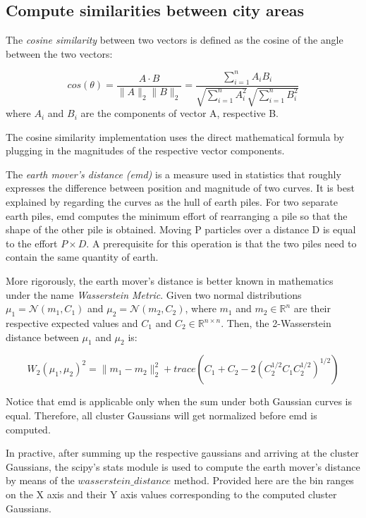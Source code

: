 \documentclass{ws-ijait}
\begin{document}
	\subsection{Compute similarities between city areas}
	The \textit{cosine similarity} between two vectors is defined as the cosine of the angle between the two vectors:
	
	\begin{equation}
	cos(\theta)=\frac{A\cdot B}{{\lVert}A{\rVert}       
		_2{\lVert}B{\rVert}_2}=\frac{\sum_{i=1}^n{A_iB_i}}{\sqrt{\sum_{i=1}^n{A_i^2}}\sqrt{\sum_{i=1}^n{B_i^2}}}
	\end{equation}
	where $A_i$ and $B_i$ are the components of vector A, respective B. 
	
	The cosine similarity implementation uses the direct mathematical formula by plugging in the magnitudes of the respective vector components.
	
	The \textit{earth mover's distance (emd)} is a measure used in statistics that roughly expresses the difference between position and magnitude of two curves. It is best explained by regarding the curves as the hull of earth piles. For two separate earth piles, emd computes the minimum effort of rearranging a pile so that the shape of the other pile is obtained. Moving P particles over a distance D is equal to the effort $P \times D$. A prerequisite for this operation is that the two piles need to contain the same quantity of earth.
	
	More rigorously, the earth mover's distance is better known in mathematics under the name \textit{Wasserstein Metric}. Given two normal distributions $\mu_1=\mathcal{N}(m_1,C_1)$ and $\mu_2=\mathcal{N}(m_2,C_2)$, where $m_1$ and $m_2 \in \mathbb{R}^{n}$ are their respective expected values and $C_1$ and $C_2 \in \mathbb{R}^{n\times n}$. Then, the 2-Wasserstein distance between $\mu_1$ and $\mu_2$ is:
	
	\begin{equation}
	W_2(\mu_1,\mu_2)^2={\lVert}m_1-m_2{\rVert}^2_2+trace(C_1+C_2-2(C_2^{1/2}C_1C_2^{1/2})^{1/2})
	\end{equation}
	
	Notice that emd is applicable only when the sum under both Gaussian curves is equal. Therefore, all cluster Gaussians will get normalized before emd is computed.
	
	In practive, after summing up the respective gaussians and arriving at the cluster Gaussians, the scipy's stats module is used to compute the earth mover's distance by means of the $wasserstein\_distance$ method. Provided here are the bin ranges on the X axis and their Y axis values corresponding to the computed cluster Gaussians.
	
\end{document}
